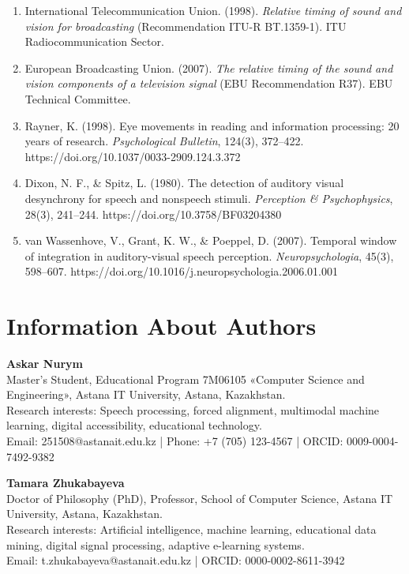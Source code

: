 \documentclass[12pt,a4paper]{article}
\begin{document}
\begin{enumerate}
    \item International Telecommunication Union. (1998). \textit{Relative timing of sound and vision for broadcasting} (Recommendation ITU-R BT.1359-1). ITU Radiocommunication Sector.
    \item European Broadcasting Union. (2007). \textit{The relative timing of the sound and vision components of a television signal} (EBU Recommendation R37). EBU Technical Committee.
    \item Rayner, K. (1998). Eye movements in reading and information processing: 20 years of research. \textit{Psychological Bulletin}, 124(3), 372--422. https://doi.org/10.1037/0033-2909.124.3.372
    \item Dixon, N. F., \& Spitz, L. (1980). The detection of auditory visual desynchrony for speech and nonspeech stimuli. \textit{Perception \& Psychophysics}, 28(3), 241--244. https://doi.org/10.3758/BF03204380
    \item van Wassenhove, V., Grant, K. W., \& Poeppel, D. (2007). Temporal window of integration in auditory-visual speech perception. \textit{Neuropsychologia}, 45(3), 598--607. https://doi.org/10.1016/j.neuropsychologia.2006.01.001
\end{enumerate}

\vspace{0.4cm}

\section*{Information About Authors}
\textbf{Askar Nurym} \\
Master's Student, Educational Program 7M06105 «Computer Science and Engineering», Astana IT University, Astana, Kazakhstan. \\
Research interests: Speech processing, forced alignment, multimodal machine learning, digital accessibility, educational technology. \\
Email: 251508@astanait.edu.kz \quad | \quad Phone: +7 (705) 123-4567 \quad | \quad ORCID: 0009-0004-7492-9382 \par
\vspace{0.3cm}
\textbf{Tamara Zhukabayeva} \\
Doctor of Philosophy (PhD), Professor, School of Computer Science, Astana IT University, Astana, Kazakhstan. \\
Research interests: Artificial intelligence, machine learning, educational data mining, digital signal processing, adaptive e-learning systems. \\
Email: t.zhukabayeva@astanait.edu.kz \quad | \quad ORCID: 0000-0002-8611-3942
\end{document}
